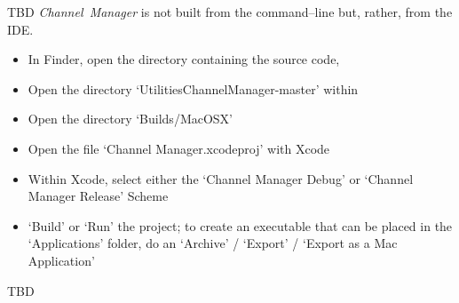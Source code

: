 \tertiaryEnd{}
TBD
\tertiaryEnd{}
\secondaryEnd{}
\textit{Channel~Manager} is not built from the command--line but, rather, from the IDE.
\begin{itemize}
\item In Finder, open the directory containing the \mplusm source code, 
\item Open the directory `Utilities\fatUnderscore{}ChannelManager-master' within
\item Open the directory `Builds/MacOSX'
\item Open the file `Channel Manager.xcodeproj' with Xcode
\item Within Xcode, select either the `Channel Manager Debug' or `Channel Manager Release'
Scheme
\item `Build' or `Run' the project; to create an executable that can be placed in the
`Applications' folder, do an `Archive' / `Export' / `Export as a Mac Application'
\end{itemize}
\tertiaryEnd{}
TBD
\tertiaryEnd{}
\secondaryEnd{}
\appendixEnd{}
